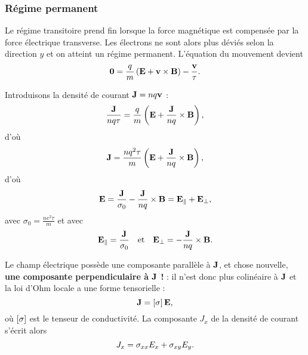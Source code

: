 \documentclass[11pt,a4paper]{report}
\begin{document}
%

\subsubsection{Régime permanent}

Le régime transitoire prend fin lorsque la force magnétique est compensée par la force électrique transverse. Les électrons ne sont alors plus déviés selon la direction $y$ et on atteint un régime permanent. L'équation du mouvement devient
\begin{equation}
	\bold{0} = \frac{q}{m}\left(\bold{E} + \bold{v}\times\bold{B}\right) - \frac{\bold{v}}{\tau}.
\end{equation}

Introduisons la densité de courant $\bold{J} = n q \bold{v}$ :
\begin{equation}
	\frac{\bold{J}}{nq\tau} = \frac{q}{m}\left(\bold{E} + \frac{\bold{J}}{nq}\times\bold{B}\right),
\end{equation}
d'où 
\begin{equation}
	\bold{J} = \frac{nq^2\tau}{m}\left( \bold{E} + \frac{\bold{J}}{nq}\times\bold{B}\right),
\end{equation}
d'où
\begin{equation}
	\bold{E} = \frac{\bold{J}}{\sigma_0} - \frac{\bold{J}}{nq}\times\bold{B} = \bold{E}_\parallel + \bold{E}_\perp,
\end{equation}
avec $\sigma_0 = \frac{ne^2\tau}{m}$ et avec
\begin{equation}
	\bold{E}_\parallel = \frac{\bold{J}}{\sigma_0} \quad\text{et}\quad \bold{E}_\perp = - \frac{\bold{J}}{nq}\times\bold{B}.\\
\end{equation}

Le champ électrique possède une composante parallèle à $\bold{J}$, et chose nouvelle, \textbf{une composante perpendiculaire à $\bold{J}$ !} : il n'est donc plus colinéaire à $\bold{J}$ et la loi d'Ohm locale a une forme tensorielle :
\begin{equation}
	\bold{J} = \left[\bold{\sigma}\right]\bold{E},
\end{equation}
où $\left[\bold{\sigma}\right]$ est le tenseur de conductivité. La composante $J_x$ de la densité de courant s'écrit alors
\begin{equation}
	J_x = \sigma_{xx} E_x + \sigma_{xy} E_y.\\
\end{equation}
\end{document}
